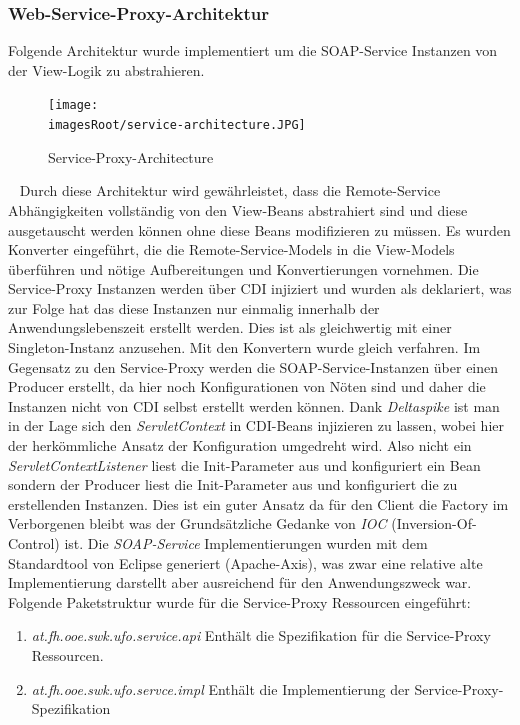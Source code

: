 \documentclass[11pt, a4paper, twoside]{article}   	%
\newcommand{\imagesRoot}{images}
\begin{document}
\subsubsection{Web-Service-Proxy-Architektur}
Folgende Architektur wurde implementiert um die SOAP-Service Instanzen von der View-Logik zu abstrahieren.
\begin{figure}[h]
	\centering
	\texttt{[image: \\imagesRoot/service-architecture.JPG]}
	\caption
	{Service-Proxy-Architecture}
\end{figure}
\ \newline
Durch diese Architektur wird gewährleistet, dass die Remote-Service Abhängigkeiten vollständig von den View-Beans abstrahiert sind und diese ausgetauscht werden können ohne diese Beans modifizieren zu müssen. Es wurden Konverter eingeführt, die die Remote-Service-Models in die View-Models überführen und nötige Aufbereitungen und Konvertierungen vornehmen. 
\newline
\newline
Die Service-Proxy Instanzen werden über CDI injiziert und wurden als
\newline
{} deklariert, was zur Folge hat das diese Instanzen nur einmalig innerhalb der Anwendungslebenszeit erstellt werden. Dies ist als gleichwertig mit einer Singleton-Instanz anzusehen. Mit den Konvertern wurde gleich verfahren.
\newline
\newline
Im Gegensatz zu den Service-Proxy werden die SOAP-Service-Instanzen über einen Producer erstellt, da hier noch Konfigurationen von Nöten sind und daher die Instanzen nicht von CDI selbst erstellt werden können. Dank \emph{Deltaspike} ist man in der Lage sich den \emph{ServletContext} in CDI-Beans injizieren zu lassen, wobei hier der herkömmliche Ansatz der Konfiguration umgedreht wird. Also nicht ein \emph{ServletContextListener} liest die Init-Parameter aus und konfiguriert ein Bean sondern der Producer liest die Init-Parameter aus und  konfiguriert die zu erstellenden Instanzen. Dies ist ein guter Ansatz da für den Client die Factory im Verborgenen bleibt was der Grundsätzliche Gedanke von \emph{IOC} (Inversion-Of-Control) ist.
\newline
\newline
Die \emph{SOAP-Service} Implementierungen wurden mit dem Standardtool von Eclipse generiert (Apache-Axis), was zwar eine relative alte Implementierung darstellt aber ausreichend für den Anwendungszweck war.
\newline
\newline
Folgende Paketstruktur wurde für die Service-Proxy Ressourcen eingeführt:
\begin{enumerate}
	\item\emph{at.fh.ooe.swk.ufo.service.api}
	\newline
	Enthält die Spezifikation für die Service-Proxy Ressourcen.
	\item\emph{at.fh.ooe.swk.ufo.servce.impl}
	\newline
	Enthält die Implementierung der Service-Proxy-Spezifikation
\end{enumerate}
\newpage
\end{document}
